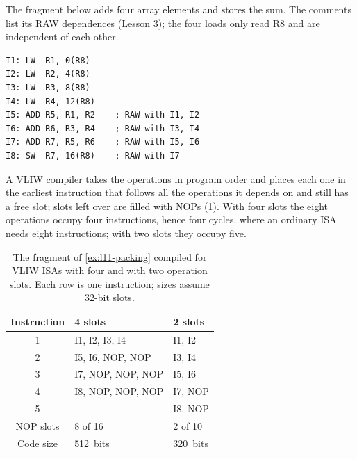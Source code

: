 \documentclass[../main.tex]{subfiles}
\begin{document}
\begin{example}
  \label{ex:l11-packing}
  The fragment below adds four array elements and stores the sum.  The
  comments list its RAW dependences (Lesson 3); the four loads only read R8
  and are independent of each other.
  \begin{lstlisting}[language={[x86masm]Assembler}, numbers=none]
I1: LW  R1, 0(R8)
I2: LW  R2, 4(R8)
I3: LW  R3, 8(R8)
I4: LW  R4, 12(R8)
I5: ADD R5, R1, R2    ; RAW with I1, I2
I6: ADD R6, R3, R4    ; RAW with I3, I4
I7: ADD R7, R5, R6    ; RAW with I5, I6
I8: SW  R7, 16(R8)    ; RAW with I7
\end{lstlisting}
  A VLIW compiler takes the operations in program order and places each one
  in the earliest instruction that follows all the operations it depends on
  and still has a free slot; slots left over are filled with NOPs
  (\cref{tab:l11-packing}).  With
  four slots the eight operations occupy four instructions, hence four cycles,
  where an ordinary ISA needs eight instructions; with two slots they occupy
  five.
\end{example}

\begin{table}[htbp]
  \centering\small
  \caption{The fragment of \cref{ex:l11-packing} compiled for VLIW ISAs with
    four and with two operation slots.  Each row is one instruction; sizes
    assume 32-bit slots.}
  \label{tab:l11-packing}
  \begin{tabular}{@{}cll@{}}
    \toprule
    Instruction & 4 slots            & 2 slots \\
    \midrule
    1           & I1, I2, I3, I4     & I1, I2 \\
    2           & I5, I6, NOP, NOP   & I3, I4 \\
    3           & I7, NOP, NOP, NOP  & I5, I6 \\
    4           & I8, NOP, NOP, NOP  & I7, NOP \\
    5           & ---                & I8, NOP \\
    \midrule
    NOP slots   & 8 of 16            & 2 of 10 \\
    Code size   & 512~bits           & 320~bits \\
    \bottomrule
  \end{tabular}
\end{table}
\end{document}
